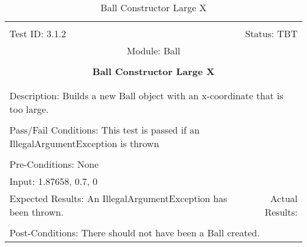 \documentclass[titlepage]{article}
\begin{document}
\begin{center}%
\begin{table}[h!]
\begin{tabular}{|l r|}\hline&\\[-2mm]
	Test ID: 3.1.2	&Status: TBT\\[-3mm]
	\multicolumn{2}{|c|}{Module: Ball}\\&\\
	\multicolumn{2}{|c|}{\textbf{\large{Ball Constructor Large X}}}\\&\\\hline&\\[-3mm]
	\multicolumn{2}{|p{\textwidth}|}{Description: Builds a new Ball object with an x-coordinate that is too large.}\\[1mm]\hline&\\[-3mm]
	\multicolumn{2}{|p{\textwidth}|}{Pass/Fail Conditions: This test is passed if an IllegalArgumentException is thrown}\\[1mm]\hline&\\[-3mm]
	\multicolumn{2}{|p{\textwidth}|}{Pre-Conditions: None}\\[4mm]
	\multicolumn{2}{|p{\textwidth}|}{Input: 1.87658, 0.7, 0}\\[2mm]\hline
	\multicolumn{1}{|p{0.49\textwidth}}{Expected Results: An IllegalArgumentException has been thrown.}	&\multicolumn{1}{|p{0.45\textwidth}|}{Actual Results:}\\\hline&\\[-3mm]
	\multicolumn{2}{|p{\textwidth}|}{Post-Conditions: There should not have been a Ball created.}\\\hline
\end{tabular}
\caption{Ball Constructor Large X}
\end{table}
\end{center}
\end{document}
